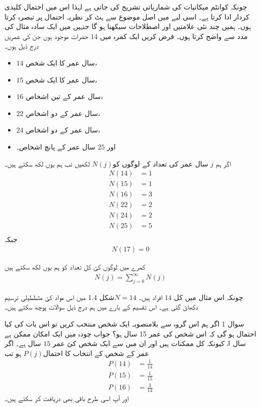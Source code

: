 
چونکہ کوانٹم میکانیات کی شماریاتی تشریح کی جاتی ہے  لہٰذا  اس میں احتمال کلیدی کردار ادا کرتا ہے۔ اسی لیے میں اصل موضوع سے ہٹ کر  نظریہ احتمال پر تبصرہ کرتا ہوں۔ ہمیں چند نئی علامتیں  اور اصطلاحات سیکھنا ہو گا جنہیں میں ایک سادہ مثال کی مدد سے  واضح کرتا ہوں۔ 
فرض کریں ایک کمرہ   میں  \( 14 \)  حضرات موجود ہوں جن  کی  عمریں درج ذیل ہوں۔ 
\begin{itemize}
\item
 \( 14 \) سال عمر کا ایک شخص، 
\item
 \( 15 \) سال عمر کا ایک شخص، 
\item
 \( 16 \) سال عمر کے تین اشخاص، 
\item
 \( 22 \) سال عمر کے دو اشخاص، 
\item
 \( 24 \) سال عمر کے دو اشخاص، 
\item
 اور  \( 25 \) سال عمر کے پانچ  اشخاص۔
\end{itemize} 
اگر ہم \( j \) سال عمر کی تعداد کے لوگوں کو\( N(j) \) لکھیں تب ہم یوں لکھ سکتے ہیں۔ 
\begin{align*}
N(14) &= 1 \\
N(15) &= 1 \\
N(16) &= 3 \\
N(22) &= 2 \\
N(24) &= 2 \\
N(25) &= 5 \\
\end{align*}
جبکہ 
\begin{align*}
N(17) = 0
\end{align*}


کمرے میں لوگوں کئ کل تعداد کو ہم یوں لکھ سکتے ہیں 
\begin{align*}
N(j) = \sum_{j=0}^{\infty} N(j)
\end{align*}

چونکہ اس مثال میں کل \( 14 \) افراد ہیں۔
\( N=14 \)شکل 1.4 میں اس مواد کئ مثططیلی ترسیم دکھائ گئی ہے۔ اس تقسیم کے بارے میں ہم درج ذیل سوالات پوچھ سکتے ہیں۔ 

سوال 1
اگر ہم اس گروہ سے بلامنصوبہ ایک شخص منتخب کریں تو اس بات کی کیا احتمال ہو گی کہ اس شخص کی عمر 15 سال ہو؟
جواب 
چودہ میں ایک امکان ممکن ہے کیونکہ کل  ممکنات ہیں اور ان میں سے ایک شخص کئ عمر \( 15 \) سال ہے۔ اگر J سال عمر کے شخص کے انتخاب کا احتمال\( P(j) \) ہو تب 
\begin{align*}
P(14) &= \frac{1}{14} \\
P(15) &= \frac{1}{15} \\
P(16) &= \frac{3}{14}
\end{align*}
اور آپ اسی طرح باقی بھی دریافت کر سکتے ہیں۔ 

